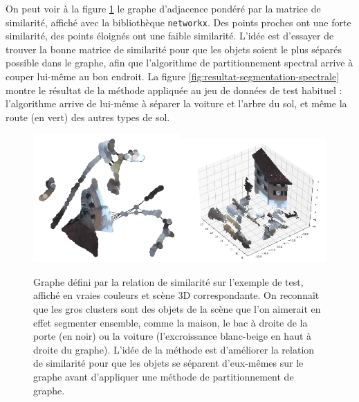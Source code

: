 \documentclass[a4paper, onecolumn, 11pt]{article}
\begin{document}
On peut voir à la figure \ref{fig:network_kernel} le graphe d'adjacence pondéré par la matrice de similarité, affiché avec la bibliothèque \texttt{networkx}. Des points proches ont une forte similarité, des points éloignés ont une faible similarité. L'idée est d'essayer de trouver la bonne matrice de similarité pour que les objets soient le plus séparés possible dans le graphe, afin que l'algorithme de partitionnement spectral arrive à couper lui-même au bon endroit. La figure \ref{fig:resultat-segmentation-spectrale} montre le résultat de la méthode appliquée au jeu de données de test habituel : l'algorithme arrive de lui-même à séparer la voiture et l'arbre du sol, et même la route (en vert) des autres types de sol.

\begin{figure}[h]
    \centering
    \includegraphics[width=0.5\textwidth]{fig/nx_graph.png}\includegraphics[width=0.5\textwidth]{fig/nx_3d_realcolor.png}
    \caption{Graphe défini par la relation de similarité sur l'exemple de test, affiché en vraies couleurs et scène 3D correspondante. On reconnaît que les gros clusters sont des objets de la scène que l'on aimerait en effet segmenter ensemble, comme la maison, le bac à droite de la porte (en noir) ou la voiture (l'excroissance blanc-beige en haut à droite du graphe). L'idée de la méthode est d'améliorer la relation de similarité pour que les objets se séparent d'eux-mêmes sur le graphe avant d'appliquer une méthode de partitionnement de graphe.}
    \label{fig:network_kernel}
\end{figure}
\end{document}
